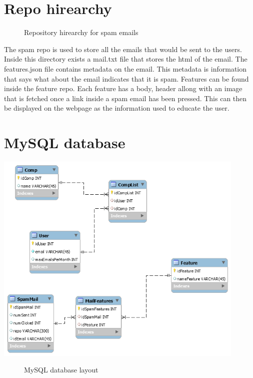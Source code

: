 \documentclass{article}
\begin{document}
\section{Repo hirearchy}

\begin{figure}[H]
\caption{Repository hirearchy for spam emails}
\end{figure}

The spam repo is used to store all the emails that would be sent to the users. Inside this directory exists a mail.txt file that stores the html of the email. The features.json file contains metadata on the email. This metadata is information that says what about the email indicates that it is spam. Features can be found inside the feature repo. Each feature has a body, header allong with an image that is fetched once a link inside a spam email has been pressed. This can then be displayed on the webpage as the information used to educate the user.

\section{MySQL database}
\begin{center}
    \centering
    \includegraphics[width=0.9\textwidth]{database}
    \begin{figure}[H]
        \caption{MySQL database layout}
    \end{figure}
\end{center}
\end{document}
